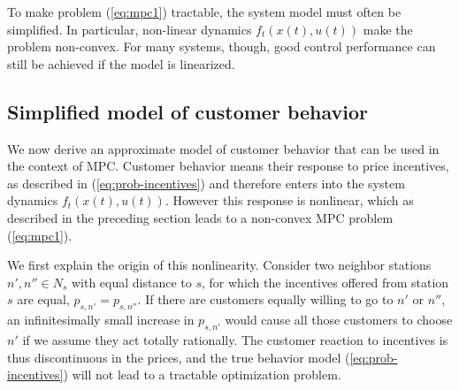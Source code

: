 \documentclass{article}
\begin{document}
To make problem (\ref{eq:mpc1}) tractable, the system model must often be
simplified. In particular, non-linear dynamics $f_t(x(t),u(t))$ make the problem
non-convex. For many systems, though, good control performance can still be
achieved if the model is linearized.


\subsection{Simplified model of customer behavior}
\label{sec:simpl-model-cust}
We now derive an approximate model of customer behavior that can be used in the
context of MPC. Customer behavior means their response to price incentives, as
described in (\ref{eq:prob-incentives}) and therefore enters into the system
dynamics $f_t(x(t),u(t))$. However this response is nonlinear, which as
described in the preceding section leads to a non-convex MPC problem
(\ref{eq:mpc1}).

We first explain the origin of this nonlinearity. Consider two neighbor stations
$n', n'' \in N_s$ with equal distance to $s$, for which the incentives offered
from station $s$ are equal, $p_{s,n'} = p_{s,n''}$. If there are customers
equally willing to go to $n'$ or $n''$, an infinitesimally small increase in
$p_{s,n'}$ would cause all those customers to choose $n'$ if we assume they act
totally rationally. The customer reaction to incentives is thus discontinuous in
the prices, and the true behavior model (\ref{eq:prob-incentives}) will not lead to a tractable
optimization problem.
\end{document}

